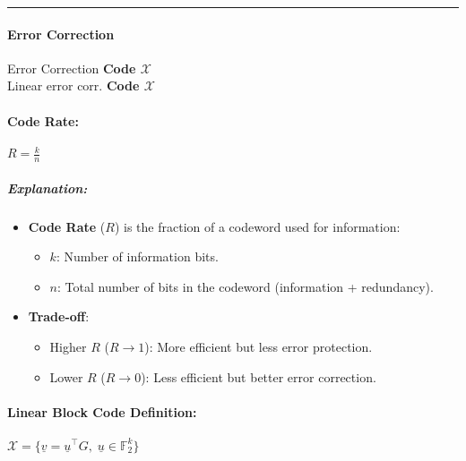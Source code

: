 \documentclass[11pt]{article}
\providecommand{\tightlist}{%
      \setlength{\itemsep}{0pt}\setlength{\parskip}{0pt}}
\begin{document}
\begin{center}\rule{0.5\linewidth}{0.5pt}\end{center}

\paragraph{Error Correction}\label{error-correction}

Error Correction \textbf{Code \(\mathcal{X}\)}\\
Linear error corr. \textbf{Code \(\mathcal{X}\)}

\paragraph{\texorpdfstring{\textbf{Code
Rate}:}{Code Rate:}}\label{code-rate}

\(\boxed{R = \frac{k}{n}}\)

\subparagraph{Explanation:}\label{explanation}

\begin{itemize}
\tightlist
\item
  \textbf{Code Rate} (\(R\)) is the fraction of a codeword used for
  information:

  \begin{itemize}
  \tightlist
  \item
    \(k\): Number of information bits.
  \item
    \(n\): Total number of bits in the codeword (information +
    redundancy).
  \end{itemize}
\item
  \textbf{Trade-off}:

  \begin{itemize}
  \tightlist
  \item
    Higher \(R\) (\(R \to 1\)): More efficient but less error
    protection.
  \item
    Lower \(R\) (\(R \to 0\)): Less efficient but better error
    correction.
  \end{itemize}
\end{itemize}

\paragraph{\texorpdfstring{\textbf{Linear Block Code
Definition}:}{Linear Block Code Definition:}}\label{linear-block-code-definition}

\(\boxed{\mathcal{X} = \{ \underline{v} = \underline{u}^\top G, \; \underline{u} \in \mathbb{F}_2^k \}}\)
\end{document}
